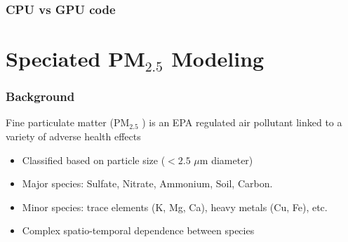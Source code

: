 \documentclass[t]{beamer}\usepackage[]{graphicx}\usepackage[]{color}
\newcommand{\PM}{$\text{PM}_{2.5}$ }
\begin{document}

\begin{frame}[label=code]
\frametitle{CPU vs GPU code}

\vfill

\begin{center}

\vspace{10mm}

\end{center}

\vfill


\hyperlink{pm_lessons}{}
\end{frame}



\section{Speciated PM$_{2.5}$ Modeling}


\begin{frame}
\frametitle{Background}
    
Fine particulate matter (\PM{}) is an EPA regulated air pollutant linked to a variety of adverse health effects

\begin{itemize}
  \vspace{2mm} \item Classified based on particle size ($<2.5$ $\mu$m diameter)
  \vspace{2mm} \item Major species: Sulfate, Nitrate, Ammonium, Soil, Carbon.
  \vspace{2mm} \item Minor species: trace elements (K, Mg, Ca), heavy metals (Cu, Fe), etc.
  \vspace{2mm} \item Complex spatio-temporal dependence between species
\end{itemize}


\end{frame}
\end{document}
